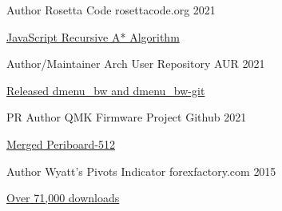 

\begin{cventries}


  \cventry
    {Author} %
    {Rosetta Code} %
    {rosettacode.org} %
    {2021} %
    {
      \begin{cvitems} %
        \item {
            \href{https://rosettacode.org/wiki/A*_search_algorithm#JavaScript}
            {JavaScript Recursive A* Algorithm \faExternalLink}
        }
      \end{cvitems}
    }

  \cventry
    {Author/Maintainer} %
    {Arch User Repository} %
    {AUR} %
    {2021} %
    {
      \begin{cvitems} %
        \item {
            \href{https://aur.archlinux.org/packages/dmenu_bw/}
            {Released dmenu\_bw and dmenu\_bw-git \faExternalLink}
        }
      \end{cvitems}
    }

  \cventry
    {PR Author} %
    {QMK Firmware Project} %
    {Github} %
    {2021} %
    {
      \begin{cvitems} %
        \item {
            \href{https://github.com/qmk/qmk_firmware/pull/12324}
            {Merged Periboard-512 \faExternalLink}
        }
      \end{cvitems}
    }

  \cventry
    {Author} %
    {Wyatt's Pivots Indicator} %
    {forexfactory.com} %
    {2015} %
    {
      \begin{cvitems} %
        \item {
            \href{https://www.forexfactory.com/thread/538297-the-best-pivot-points-indicator-ever}
            {Over 71,000 downloads \faExternalLink}
        }
      \end{cvitems}
    }

\end{cventries}
